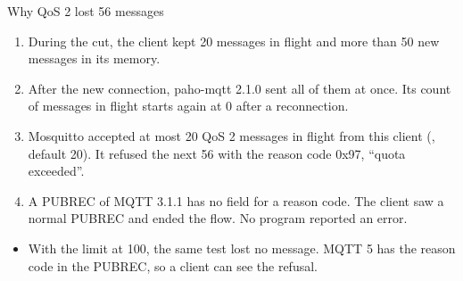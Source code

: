 \begin{frame}{Why QoS 2 lost 56 messages}
  \small
  \begin{enumerate}
    \item During the cut, the client kept 20 messages in flight and more
          than 50 new messages in its memory.
    \item After the new connection, paho-mqtt 2.1.0 sent all of them at
          once. Its count of messages in flight starts again at 0 after a
          reconnection.
    \item Mosquitto accepted at most 20 QoS 2 messages in flight from this
          client (, default 20). It refused
          the next 56 with the reason code 0x97, ``quota exceeded''.
    \item A PUBREC of MQTT 3.1.1 has no field for a reason code. The client
          saw a normal PUBREC and ended the flow. No program reported an
          error.
  \end{enumerate}
  \begin{itemize}
    \item With the limit at 100, the same test lost no message. MQTT 5 has
          the reason code in the PUBREC, so a client can see the refusal.
  \end{itemize}
\end{frame}

